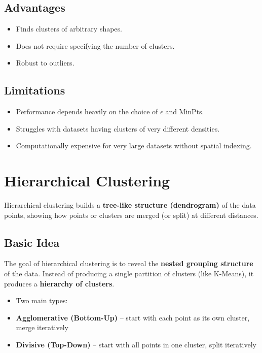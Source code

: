\documentclass[10pt,a4paper]{article}
\begin{document}
	\subsection{Advantages}

	\begin{itemize}
		\item Finds clusters of arbitrary shapes.
		\item Does not require specifying the number of clusters.
		\item Robust to outliers.
	\end{itemize}

	\subsection{Limitations}

	\begin{itemize}
		\item Performance depends heavily on the choice of $\epsilon$ and MinPts.
		\item Struggles with datasets having clusters of very different densities.
		\item Computationally expensive for very large datasets without spatial indexing.
	\end{itemize}

	\section{Hierarchical Clustering}

	Hierarchical clustering builds a \textbf{tree-like structure (dendrogram)} of the data points, showing how points or clusters are merged (or split) at different distances.

	\subsection{Basic Idea}

	The goal of hierarchical clustering is to reveal the \textbf{nested grouping structure} of the data.
	Instead of producing a single partition of clusters (like K-Means), it produces a \textbf{hierarchy of clusters}.

	\begin{itemize}
		\item Two main types:
		\item \textbf{Agglomerative (Bottom-Up)} – start with each point as its own cluster, merge iteratively
		\item \textbf{Divisive (Top-Down)} – start with all points in one cluster, split iteratively
	\end{itemize}
\end{document}
